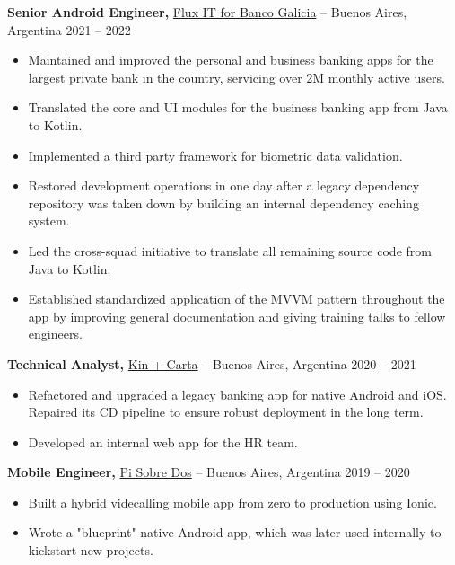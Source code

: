 \documentclass[11pt]{article}       %
\begin{document}
\textbf{Senior Android Engineer,} \href{https://fluxitsoft.com/}{Flux IT for Banco Galicia} -- Buenos Aires, Argentina \hfill 2021 -- 2022 \\
\vspace{-6pt}
\begin{itemize}
  \item Maintained and improved the personal and business banking apps for the largest private bank in the country, servicing over 2M monthly active users.
  \item Translated the core and UI modules for the business banking app from Java to Kotlin.
  \item Implemented a third party framework for biometric data validation.
  \item Restored development operations in one day after a legacy dependency repository was taken down by building an internal dependency caching system.
  \item Led the cross-squad initiative to translate all remaining source code from Java to Kotlin.
  \item Established standardized application of the MVVM pattern throughout the app by improving general documentation and giving training talks to fellow engineers.
\end{itemize}

\vspace{3pt}

\textbf{Technical Analyst,} \href{http://www.kinandcarta.com/}{Kin + Carta} -- Buenos Aires, Argentina \hfill 2020 -- 2021 \\
\vspace{-6pt}
\begin{itemize}
  \item Refactored and upgraded a legacy banking app for native Android and iOS. Repaired its CD pipeline to ensure robust deployment in the long term.
  \item Developed an internal web app for the HR team.
\end{itemize}

\vspace{3pt}

\textbf{Mobile Engineer,} \href{https://pisobredos.com/}{Pi Sobre Dos} -- Buenos Aires, Argentina \hfill 2019 -- 2020 \\
\vspace{-6pt}
\begin{itemize}
  \item Built a hybrid videcalling mobile app from zero to production using Ionic.
  \item Wrote a "blueprint" native Android app, which was later used internally to kickstart new projects.
\end{itemize}
\end{document}
